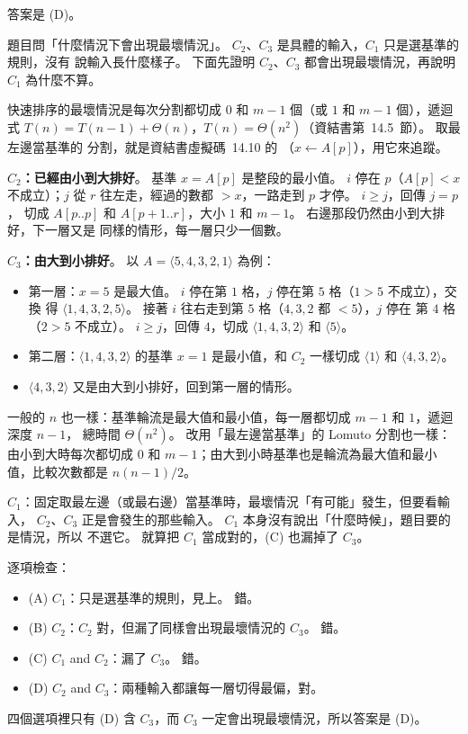 \begin{pastsoln}
答案是 (D)。

題目問「什麼情況下會出現最壞情況」。 $C_2$、$C_3$ 是具體的輸入，$C_1$ 只是選基準的規則，沒有
說輸入長什麼樣子。 下面先證明 $C_2$、$C_3$ 都會出現最壞情況，再說明 $C_1$ 為什麼不算。

快速排序的最壞情況是每次分割都切成 $0$ 和 $m - 1$ 個（或 $1$ 和 $m - 1$ 個），遞迴式
$T(n) = T(n - 1) + \Theta(n)$，$T(n) = \Theta(n^2)$（資結書第~14.5~節）。 取最左邊當基準的
分割，就是資結書虛擬碼~14.10 的 （$x \gets A[p]$），用它來追蹤。

\textbf{$C_2$：已經由小到大排好}。 基準 $x = A[p]$ 是整段的最小值。 $i$ 停在 $p$（$A[p] < x$
不成立）；$j$ 從 $r$ 往左走，經過的數都 $> x$，一路走到 $p$ 才停。 $i \ge j$，回傳 $j = p$，
切成 $A[p..p]$ 和 $A[p+1..r]$，大小 $1$ 和 $m - 1$。 右邊那段仍然由小到大排好，下一層又是
同樣的情形，每一層只少一個數。

\textbf{$C_3$：由大到小排好}。 以 $A = \langle 5, 4, 3, 2, 1\rangle$ 為例：
\begin{itemize}
\item 第一層：$x = 5$ 是最大值。 $i$ 停在第 $1$ 格，$j$ 停在第 $5$ 格（$1 > 5$ 不成立），交換
得 $\langle 1, 4, 3, 2, 5\rangle$。 接著 $i$ 往右走到第 $5$ 格（$4, 3, 2$ 都 $< 5$），$j$ 停在
第 $4$ 格（$2 > 5$ 不成立）。 $i \ge j$，回傳 $4$，切成 $\langle 1, 4, 3, 2\rangle$ 和
$\langle 5\rangle$。
\item 第二層：$\langle 1, 4, 3, 2\rangle$ 的基準 $x = 1$ 是最小值，和 $C_2$ 一樣切成
$\langle 1\rangle$ 和 $\langle 4, 3, 2\rangle$。
\item $\langle 4, 3, 2\rangle$ 又是由大到小排好，回到第一層的情形。
\end{itemize}
一般的 $n$ 也一樣：基準輪流是最大值和最小值，每一層都切成 $m - 1$ 和 $1$，遞迴深度 $n - 1$，
總時間 $\Theta(n^2)$。 改用「最左邊當基準」的 Lomuto 分割也一樣：由小到大時每次都切成 $0$ 和
$m - 1$；由大到小時基準也是輪流為最大值和最小值，比較次數都是 $n(n - 1)/2$。

\textbf{$C_1$}：固定取最左邊（或最右邊）當基準時，最壞情況「有可能」發生，但要看輸入，
$C_2$、$C_3$ 正是會發生的那些輸入。 $C_1$ 本身沒有說出「什麼時候」，題目要的是情況，所以
不選它。 就算把 $C_1$ 當成對的，(C) 也漏掉了 $C_3$。

逐項檢查：
\begin{itemize}
\item (A) $C_1$：只是選基準的規則，見上。 錯。
\item (B) $C_2$：$C_2$ 對，但漏了同樣會出現最壞情況的 $C_3$。 錯。
\item (C) $C_1$ and $C_2$：漏了 $C_3$。 錯。
\item (D) $C_2$ and $C_3$：兩種輸入都讓每一層切得最偏，對。
\end{itemize}
四個選項裡只有 (D) 含 $C_3$，而 $C_3$ 一定會出現最壞情況，所以答案是 (D)。

\end{pastsoln}
